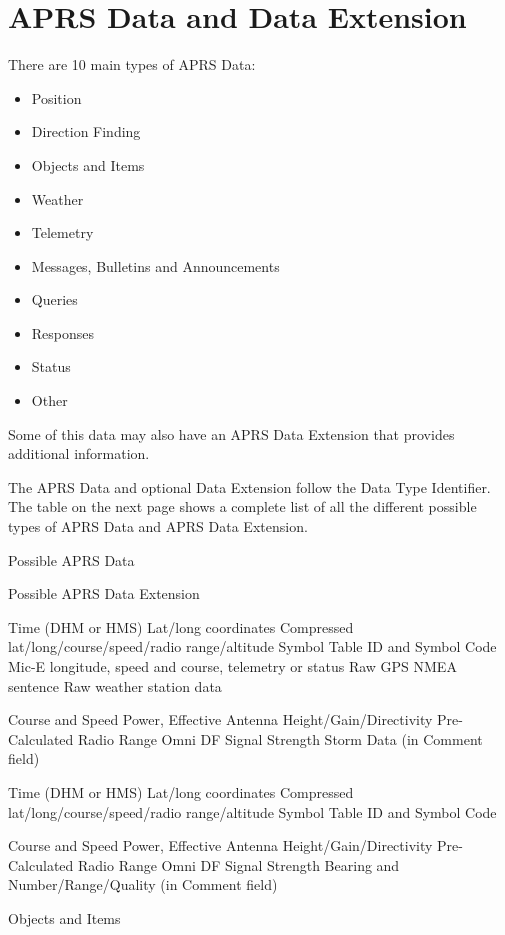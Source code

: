 \section{APRS Data and Data Extension}



There are 10 main types of APRS Data:

\begin {itemize}

\item Position
\item Direction Finding
\item Objects and Items
\item Weather
\item Telemetry
\item Messages, Bulletins and Announcements
\item Queries
\item Responses
\item Status
\item Other

\end{itemize}

Some of this data may also have an APRS Data Extension that provides
additional information.

The APRS Data and optional Data Extension follow the Data Type Identifier.
The table on the next page shows a complete list of all the different possible
types of APRS Data and APRS Data Extension.



Possible APRS Data

Possible APRS Data Extension

Time (DHM or HMS)
Lat/long coordinates
Compressed lat/long/course/speed/radio range/altitude
Symbol Table ID and Symbol Code
Mic-E longitude, speed and course, telemetry or status
Raw GPS NMEA sentence
Raw weather station data

Course and Speed
Power, Effective Antenna Height/Gain/Directivity
Pre-Calculated Radio Range
Omni DF Signal Strength
Storm Data (in Comment field)

Time (DHM or HMS)
Lat/long coordinates
Compressed lat/long/course/speed/radio range/altitude
Symbol Table ID and Symbol Code

Course and Speed
Power, Effective Antenna Height/Gain/Directivity
Pre-Calculated Radio Range
Omni DF Signal Strength
Bearing and Number/Range/Quality
(in Comment field)

Objects and
Items

